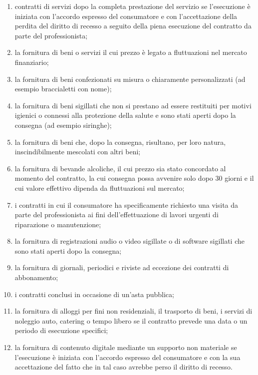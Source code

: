 \begin{enumerate}
    \item contratti di servizi dopo la completa prestazione del servizio se l'esecuzione è iniziata con l'accordo espresso del consumatore e con l'accettazione della perdita del diritto di recesso a seguito della piena esecuzione del contratto da parte del professionista;
    \item la fornitura di beni o servizi il cui prezzo è legato a fluttuazioni nel mercato finanziario;
    \item la fornitura di beni confezionati su misura o chiaramente personalizzati (ad esempio braccialetti con nome);
    \item la fornitura di beni sigillati che non si prestano ad essere restituiti per motivi igienici o connessi alla protezione della salute e sono stati aperti dopo la consegna (ad esempio siringhe);
    \item la fornitura di beni che, dopo la consegna, risultano, per loro natura, inscindibilmente mescolati con altri beni;
    \item la fornitura di bevande alcoliche, il cui prezzo sia stato concordato al momento del contratto, la cui consegna possa avvenire solo dopo 30 giorni e il cui valore effettivo dipenda da fluttuazioni sul mercato;
    \item i contratti in cui il consumatore ha specificamente richiesto una visita da parte del professionista ai fini dell'effettuazione di lavori urgenti di riparazione o manutenzione;
    \item la fornitura di registrazioni audio o video sigillate o di software sigillati che sono stati aperti dopo la consegna;
    \item la fornitura di giornali, periodici e riviste ad eccezione dei contratti di abbonamento;
    \item i contratti conclusi in occasione di un'asta pubblica;
    \item la fornitura di alloggi per fini non residenziali, il trasporto di beni, i servizi di noleggio auto, catering o tempo libero se il contratto prevede una data o un periodo di esecuzione specifici;
    \item la fornitura di contenuto digitale mediante un supporto non materiale se l'esecuzione è iniziata con l'accordo espresso del consumatore e con la sua accettazione del fatto che in tal caso avrebbe perso il diritto di recesso.
\end{enumerate}

